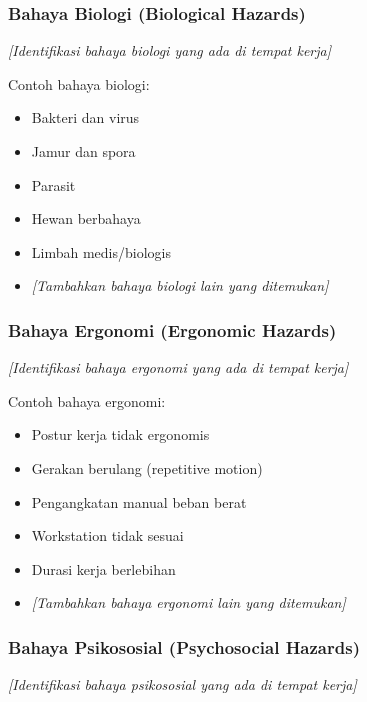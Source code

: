 \vspace{0.5cm}

\subsubsection{Bahaya Biologi (Biological Hazards)}

\textit{[Identifikasi bahaya biologi yang ada di tempat kerja]}

Contoh bahaya biologi:
\begin{itemize}
    \item Bakteri dan virus
    \item Jamur dan spora
    \item Parasit
    \item Hewan berbahaya
    \item Limbah medis/biologis
    \item \textit{[Tambahkan bahaya biologi lain yang ditemukan]}
\end{itemize}

\vspace{0.5cm}

\subsubsection{Bahaya Ergonomi (Ergonomic Hazards)}

\textit{[Identifikasi bahaya ergonomi yang ada di tempat kerja]}

Contoh bahaya ergonomi:
\begin{itemize}
    \item Postur kerja tidak ergonomis
    \item Gerakan berulang (repetitive motion)
    \item Pengangkatan manual beban berat
    \item Workstation tidak sesuai
    \item Durasi kerja berlebihan
    \item \textit{[Tambahkan bahaya ergonomi lain yang ditemukan]}
\end{itemize}

\vspace{0.5cm}

\subsubsection{Bahaya Psikososial (Psychosocial Hazards)}

\textit{[Identifikasi bahaya psikososial yang ada di tempat kerja]}

